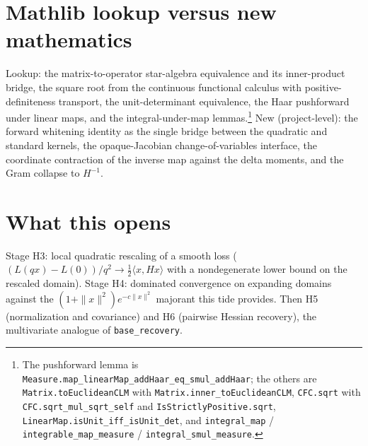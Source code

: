 \documentclass[11pt]{article}
\begin{document}
\section{Mathlib lookup versus new mathematics}

Lookup: the matrix-to-operator star-algebra equivalence and its
inner-product bridge, the square root from the continuous functional
calculus with positive-definiteness transport, the unit-determinant
equivalence, the Haar pushforward under linear maps, and the
integral-under-map lemmas.\footnote{The pushforward lemma is
\texttt{Measure.map\_linearMap\_addHaar\_eq\_smul\_addHaar}; the
others are \texttt{Matrix.toEuclideanCLM} with
\texttt{Matrix.inner\_toEuclideanCLM}, \texttt{CFC.sqrt} with
\texttt{CFC.sqrt\_mul\_sqrt\_self} and
\texttt{IsStrictlyPositive.sqrt},
\texttt{LinearMap.isUnit\_iff\_isUnit\_det}, and
\texttt{integral\_map} / \texttt{integrable\_map\_measure} /
\texttt{integral\_smul\_measure}.} New (project-level): the forward
whitening identity as the single bridge between the quadratic and
standard kernels, the opaque-Jacobian change-of-variables interface,
the coordinate contraction of the inverse map against the delta
moments, and the Gram collapse to $H^{-1}$.

\section{What this opens}

Stage H3: local quadratic rescaling of a smooth loss
($({L(qx) - L(0)})/{q^2} \to \tfrac12\langle x, Hx\rangle$ with a
nondegenerate lower bound on the rescaled domain). Stage H4:
dominated convergence on expanding domains against the
$(1+\|x\|^2)e^{-c\|x\|^2}$ majorant this tide provides. Then H5
(normalization and covariance) and H6 (pairwise Hessian recovery),
the multivariate analogue of \texttt{base\_recovery}.
\end{document}
